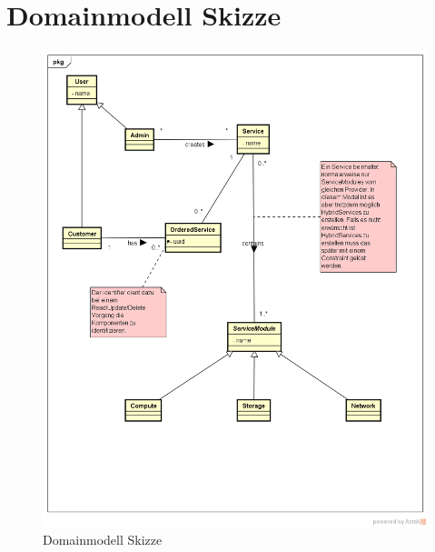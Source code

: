 \newpage
\section{Domainmodell Skizze}
\begin{figure}[!htbp]
\includegraphics[width=\textwidth]{./03_Analyse/05_DomainModel/images/SDDC-DomainModel}
\caption{Domainmodell Skizze}
\end{figure}